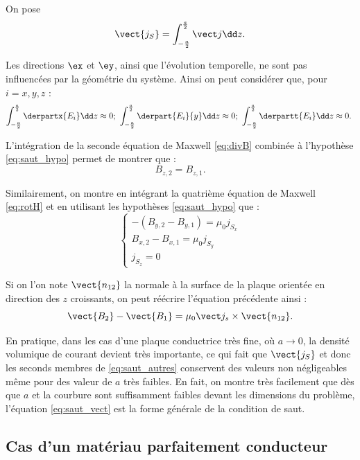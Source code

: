 On pose $$\vect{j_S} = \int_{-\frac a2}^{\frac{a}{2}}\vect j\dd z.$$

Les directions $\ex$ et $\ey$, ainsi que l'évolution temporelle, ne sont pas influencées par la géométrie du système. Ainsi on peut considérer que, pour $i = {x,y,z}$ :
\begin{equation}
	\label{eq:saut_hypo}
	\int_{-\frac a2}^{\frac{a}{2}} \derpartx{E_i}  \dd z \approx 0; \ 
	\int_{-\frac a2}^{\frac{a}{2}} \derpart{E_i}{y}\dd z \approx 0; \ 
	\int_{-\frac a2}^{\frac{a}{2}} \derpartt{E_i}  \dd z \approx 0. \ 
\end{equation}

L'intégration de la seconde équation de Maxwell \eqref{eq:divB} combinée à l'hypothèse \eqref{eq:saut_hypo} permet de montrer que :
\begin{equation}
	\label{eq:saut_z}
	B_{z,2} = B_{z,1}.
\end{equation}

Similairement, on montre en intégrant la quatrième équation de Maxwell \eqref{eq:rotH} et en utilisant les hypothèses \eqref{eq:saut_hypo} que :
\begin{equation}
	\label{eq:saut_autres}
	\left\{\begin{array}{l}
	-\left(B_{y,2} - B_{y,1}\right) = \mu_0j_{S_x} \\
	B_{x,2} - B_{x,1} = \mu_0j_{S_y} \\
	j_{S_z} = 0
	\end{array} \right.
\end{equation}

Si on l'on note $\vect{n_{12}}$ la normale à la surface de la plaque orientée en direction des $z$ croissants, on peut réécrire l'équation précédente ainsi :
\begin{equation}
	\label{eq:saut_vect}
	\vect{B_2}-\vect{B_1} = \mu_0 \vect j_s\times\vect{n_{12}}.
\end{equation}

En pratique, dans les cas d'une plaque conductrice très fine, où $a \to 0$, la densité volumique de courant devient très importante, ce qui fait que $\vect{j_S}$ et donc les seconds membres de \eqref{eq:saut_autres} conservent des valeurs non négligeables même pour des valeur de $a$ très faibles. En fait, on montre très facilement que dès que $a$ et la courbure sont suffisamment faibles devant les dimensions du problème, l'équation \eqref{eq:saut_vect} est la forme générale de la condition de saut.

	\subsection{Cas d'un matériau parfaitement conducteur}
	\label{sec:saut_pec}

